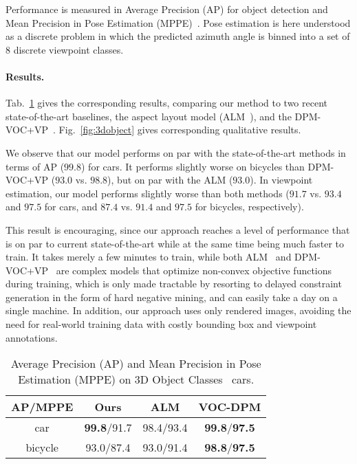  Performance is measured in Average Precision
(AP) for object detection and Mean Precision in Pose Estimation
(MPPE)~\cite{Lopez-Sastre11}. Pose estimation is here understood as a
discrete problem in which the predicted azimuth angle is binned into a
set of $8$ discrete viewpoint classes.

\paragraph{Results.}
Tab.~\ref{tab:3dobject} gives the corresponding results, comparing our
method to two recent state-of-the-art baselines, the aspect layout
model (ALM~\cite{Xiang12}), and the
DPM-VOC+VP~\cite{Pepik12}. Fig.~\ref{fig:3dobject} gives corresponding
qualitative results.

We observe that our model performs on par with the state-of-the-art
methods in terms of AP ($99.8$) for cars. It performs slightly worse
on bicycles than DPM-VOC+VP ($93.0$ vs. $98.8$), but on par with the
ALM ($93.0$). In viewpoint estimation, our model performs slightly
worse than both methods ($91.7$ vs. $93.4$ and $97.5$ for cars, and
$87.4$ vs. $91.4$ and $97.5$ for bicycles, respectively).

This result is encouraging, since our approach reaches a level of
performance that is on par to current state-of-the-art while at the
same time being much faster to train. It takes merely a few minutes to
train, while both ALM~\cite{Xiang12} and DPM-VOC+VP~\cite{Pepik12} are
complex models that optimize non-convex objective functions during
training, which is only made tractable by resorting to delayed
constraint generation in the form of hard negative mining, and can
easily take a day on a single machine. In addition, our approach uses
only rendered images, avoiding the need for real-world training data
with costly bounding box and viewpoint annotations.
%
\begin{table}[!htbp]
    \footnotesize
  \begin{center}
    \begin{tabular}{|c|c|c|c|}
    \hline
     AP/MPPE& Ours & ALM\cite{Xiang12} & VOC-DPM\cite{Pepik12} \\
    \hline\hline
    car & \textbf{99.8}/91.7 &  98.4/93.4 & \textbf{99.8}/\textbf{97.5} \\ 
    bicycle & 93.0/87.4 & 93.0/91.4 & \textbf{98.8}/\textbf{97.5} \\
    \hline
    \end{tabular}
  \end{center}
  \caption{Average Precision (AP) and Mean Precision in Pose
    Estimation (MPPE) on 3D Object Classes~\cite{Savarese07} cars.}%
  \label{tab:3dobject}
\end{table}

